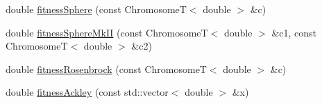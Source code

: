 \begin{DoxyCompactItemize}
double \hyperlink{struct_p_r_p_s_evolution_1_1_solve_1_1_ueber9000_a279407225ce9159c55bc9e1657780b02}{fitness\-Sphere} (const \-Chromosome\-T$<$ double $>$ \&c)
\item 
double \hyperlink{struct_p_r_p_s_evolution_1_1_solve_1_1_ueber9000_a81c7827904bc649d69154d0f05fd584e}{fitness\-Sphere\-Mk\-I\-I} (const \-Chromosome\-T$<$ double $>$ \&c1, const \-Chromosome\-T$<$ double $>$ \&c2)
\item 
double \hyperlink{struct_p_r_p_s_evolution_1_1_solve_1_1_ueber9000_a28a32009901241149fd423aaab3256f0}{fitness\-Rosenbrock} (const \-Chromosome\-T$<$ double $>$ \&c)
\item 
double \hyperlink{struct_p_r_p_s_evolution_1_1_solve_1_1_ueber9000_a52538fc6366c3f55438a2e3960aeba67}{fitness\-Ackley} (const std\-::vector$<$ double $>$ \&x)
\end{DoxyCompactItemize}
